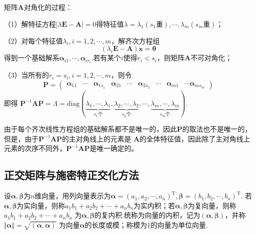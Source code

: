 \begin{theorem}
    矩阵$\boldsymbol{A}$对角化的过程：

    （1）解特征方程$|\lambda\boldsymbol{E}-\boldsymbol{A}|=0$得特征值$\lambda=\lambda_1(s_1\mbox{重}),\cdots,\lambda_m(s_m\mbox{重})$；
    
    （2）对每个特征值$\lambda_i,i=1,2,\cdots,m$，解齐次方程组$$(\lambda_i\boldsymbol{E}-\boldsymbol{A})\boldsymbol{x}=\boldsymbol{\theta}$$得到一个基础解系$\boldsymbol{\alpha}_{i1},\cdots,\boldsymbol{\alpha}_{ir_i}$.若有某个$i$使得$r_i<s_i$，则矩阵$\boldsymbol{A}$不可对角化；
    
    （3）当所有的$r_i=s_i,i=1,2,\cdots,m$，则令$$\boldsymbol{P}=\left(\begin{array}{cccccccccc}
            \boldsymbol{\alpha}_{11} & \cdots &\boldsymbol{\alpha}_{1s_1} & \boldsymbol{\alpha}_{21} & \cdots &\boldsymbol{\alpha}_{2s_2} & \cdots & \boldsymbol{\alpha}_{m1} & \cdots \boldsymbol{\alpha}_{ms_m} 
        \end{array}\right)$$即得
        $\boldsymbol{P}^{-1}\boldsymbol{A}\boldsymbol{P}=\boldsymbol{\varLambda} =\mathrm{diag}(\underbrace{\lambda_1,\cdots,\lambda_1}_{s_1\mbox{个}},\underbrace{\lambda_2,\cdots,\lambda_2}_{s_2\mbox{个}},\cdots,\underbrace{\lambda_m,\cdots,\lambda_m}_{s_m\mbox{个}})$.

    由于每个齐次线性方程组的基础解系都不是唯一的，因此$\boldsymbol{P}$的取法也不是唯一的，但是，由于$\boldsymbol{P}^{-1}\boldsymbol{A}\boldsymbol{P}$的主对角线上的元素是
    $\boldsymbol{A}$的全体特征值，因此除了主对角线上元素的次序不同外，$\boldsymbol{P}^{-1}\boldsymbol{A}\boldsymbol{P}$是唯一确定的。
\end{theorem}

\subsection{正交矩阵与施密特正交化方法}
\begin{definition}[向量内积]
    设$\boldsymbol{\alpha},\boldsymbol{\beta}$为$n$维向量，用列向量表示为$\boldsymbol{\alpha}={(a_1,a_2,\cdots,a_n)}^\mathrm{T},\boldsymbol{\beta}={(b_1,b_2,\cdots,b_n)}^\mathrm{T}$.
    若$\boldsymbol{\alpha},\boldsymbol{\beta}$为实向量，则称$a_1b_1+a_2b_2+\cdots+a_nb_n$为{\heiti 实内积}；若$\boldsymbol{\alpha},\boldsymbol{\beta}$为复向量，则称$a_1b_1+a_2b_2+\cdots+a_nb_n$
    为$\boldsymbol{\alpha},\boldsymbol{\beta}$的{\heiti 复内积}.统称为{\heiti 向量的内积}，记为$(\boldsymbol{\alpha},\boldsymbol{\beta})$，并称$\Vert\boldsymbol{\alpha}\Vert=\sqrt{(\boldsymbol{\alpha},\boldsymbol{\alpha})} $
    为向量$\boldsymbol{\alpha}$的{\heiti 长度}或{\heiti 模}；称模为1的向量为{\heiti 单位向量}.
\end{definition}

